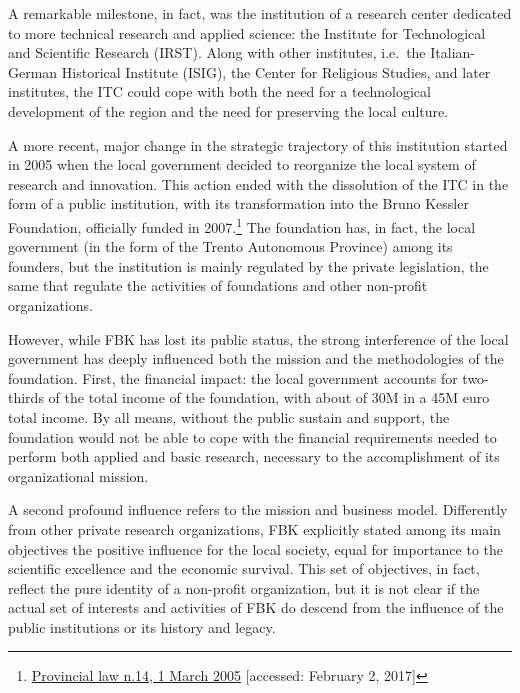 A remarkable milestone, in fact, was the institution of a research center dedicated to more technical research and applied science: the Institute for Technological and Scientific Research (IRST). Along with other institutes, i.e.\ the Italian-German Historical Institute (ISIG), the Center for Religious Studies, and later institutes, the ITC could cope with both the need for a technological development of the region and the need for preserving the local culture. 

A more recent, major change in the strategic trajectory of this institution started in 2005 when the local government decided to reorganize the local system of research and innovation. This action ended with the dissolution of the ITC in the form of a public institution, with its transformation into the Bruno Kessler Foundation, officially funded in 2007.\footnote{
	\href{http://www.consiglio.provincia.tn.it/leggi-e-archivi/codice-provinciale/archivio/Pages/Legge\%20provinciale\%202\%20agosto\%202005,\%20n.\%2014_12567.aspx?zid=6003d625-228e-4e5d-820d-d6cf459dfc36}
	{Provincial law n.14, 1 March 2005}
	[accessed: February 2, 2017]
} The foundation has, in fact, the local government (in the form of the Trento Autonomous Province) among its founders, but the institution is mainly regulated by the private legislation, the same that regulate the activities of foundations and other non-profit organizations. 

However, while FBK has lost its public status, the strong interference of the local government has deeply influenced both the mission and the methodologies of the foundation. First, the financial impact: the local government accounts for two-thirds of the total income of the foundation, with about of 30M in a 45M euro total income. By all means, without the public sustain and support, the foundation would not be able to cope with the financial requirements needed to perform both applied and basic research, necessary to the accomplishment of its organizational mission.

A second profound influence refers to the mission and business model. Differently from other private research organizations, FBK explicitly stated among its main objectives the positive influence for the local society, equal for importance to the scientific excellence and the economic survival. This set of objectives, in fact, reflect the pure identity of a non-profit organization, but it is not clear if the actual set of interests and activities of FBK do descend from the influence of the public institutions or its history and legacy.

